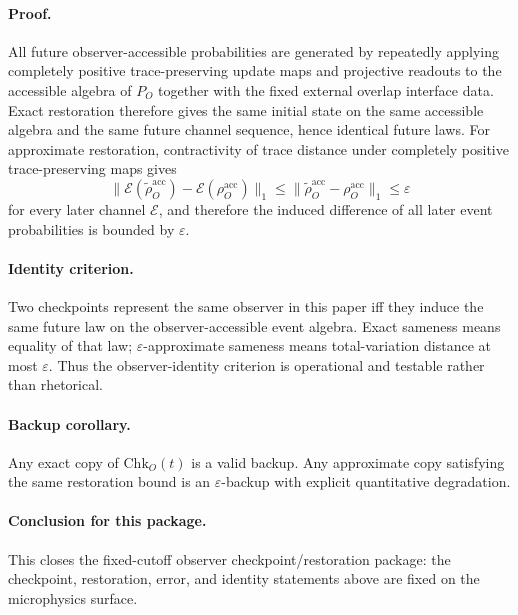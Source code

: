 \documentclass[11pt]{article}
\begin{document}
\paragraph{Proof.}
All future observer-accessible probabilities are generated by repeatedly applying completely
positive trace-preserving update maps and projective readouts to the accessible algebra of
$P_O$ together with the fixed external overlap interface data. Exact restoration therefore gives
the same initial state on the same accessible algebra and the same future channel sequence,
hence identical future laws. For approximate restoration, contractivity of trace distance under
completely positive trace-preserving maps gives
\begin{equation}
\bigl\|
\mathcal E(\widetilde \rho_O^{\mathrm{acc}})-\mathcal E(\rho_O^{\mathrm{acc}})
\bigr\|_1
\le
\bigl\|
\widetilde \rho_O^{\mathrm{acc}}-\rho_O^{\mathrm{acc}}
\bigr\|_1
\le
\varepsilon
\end{equation}
for every later channel $\mathcal E$, and therefore the induced difference of all later event
probabilities is bounded by $\varepsilon$.

\paragraph{Identity criterion.}
Two checkpoints represent the same observer in this paper iff they induce the same
future law on the observer-accessible event algebra. Exact sameness means equality of that law;
\(\varepsilon\)-approximate sameness means total-variation distance at most \(\varepsilon\).
Thus the observer-identity criterion is operational and testable rather than rhetorical.

\paragraph{Backup corollary.}
Any exact copy of $\mathrm{Chk}_O(t)$ is a valid backup. Any approximate copy satisfying the
same restoration bound is an $\varepsilon$-backup with explicit quantitative degradation.

\paragraph{Conclusion for this package.}
This closes the fixed-cutoff observer checkpoint/restoration package: the checkpoint, restoration, error, and identity statements above are fixed on the microphysics surface.
\end{document}
